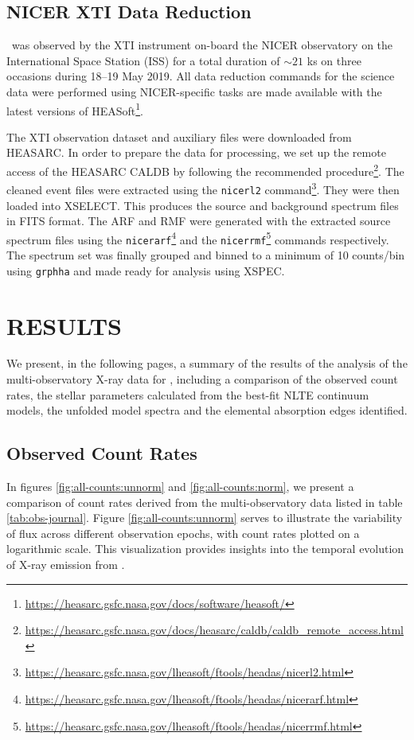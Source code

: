     	\subsection{NICER XTI Data Reduction} \label{multi-obs:red-analysis:xti}
    		\source\ was observed by the XTI instrument on-board the NICER observatory on the International Space Station (ISS) for a total duration of $\sim 21$ ks on three occasions during 18--19 May 2019. All data reduction commands for the science data were performed using NICER-specific tasks are made available with the latest versions of HEASoft\footnote{\url{https://heasarc.gsfc.nasa.gov/docs/software/heasoft/}}.
    	
	    	The XTI observation dataset and auxiliary files were downloaded from HEASARC. In order to prepare the data for processing, we set up the remote access of the HEASARC CALDB by following the recommended procedure\footnote{\url{https://heasarc.gsfc.nasa.gov/docs/heasarc/caldb/caldb_remote_access.html}}. The cleaned event files were extracted using the \texttt{nicerl2} command\footnote{\url{https://heasarc.gsfc.nasa.gov/lheasoft/ftools/headas/nicerl2.html}}. They were then loaded into XSELECT. This produces the source and background spectrum files in FITS format. The ARF and RMF were generated with the extracted source spectrum files using the \texttt{nicerarf}\footnote{\url{https://heasarc.gsfc.nasa.gov/lheasoft/ftools/headas/nicerarf.html}} and the \texttt{nicerrmf}\footnote{\url{https://heasarc.gsfc.nasa.gov/lheasoft/ftools/headas/nicerrmf.html}} commands respectively. The spectrum set was finally grouped and binned to a minimum of 10 counts/bin using \texttt{grphha} and made ready for analysis using XSPEC.
    	
    \section{\MakeUppercase{Results}} \label{multi-obs:results}
    	We present, in the following pages, a summary of the results of the analysis of the multi-observatory X-ray data for \source, including a comparison of the observed count rates, the stellar parameters calculated from the best-fit NLTE continuum models, the unfolded model spectra and the elemental absorption edges identified.
    	
    	
    	\subsection{Observed Count Rates} \label{multi-obs:results:count-rates}
    		In figures \ref{fig:all-counts:unnorm} and \ref{fig:all-counts:norm}, we present a comparison of count rates derived from the multi-observatory data listed in table \ref{tab:obs-journal}. Figure \ref{fig:all-counts:unnorm} serves to illustrate the variability of flux across different observation epochs, with count rates plotted on a logarithmic scale. This visualization provides insights into the temporal evolution of X-ray emission from \source.
    		
